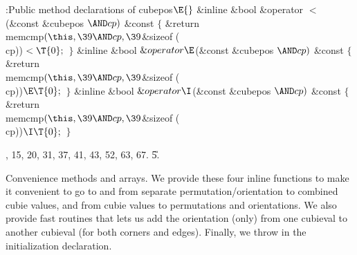 \Y\B\4:Public method declarations of cubepos\X${}\E{}$\6
\&{inline} \&{bool} \&{operator} $<$ (\&{const} \&{cubepos} ${}{\AND}\\{cp})$ %
\&{const} \6
${}\{{}$\1\6
\&{return} \\{memcmp}${}(\this,\39{\AND}\\{cp},\39{}$\&{sizeof} (\\{cp}))${}<%
\T{0};{}$\6
\4${}\}{}$\2\7
\&{inline} \&{bool} ${}\&{operator}{\E}{}$(\&{const} \&{cubepos} ${}{\AND}%
\\{cp}){}$ \&{const}\1\1\2\2\6
${}\{{}$\1\6
\&{return} \\{memcmp}${}(\this,\39{\AND}\\{cp},\39{}$\&{sizeof} (\\{cp}))${}\E%
\T{0};{}$\6
\4${}\}{}$\2\7
\&{inline} \&{bool} ${}\&{operator}{\I}{}$(\&{const} \&{cubepos} ${}{\AND}%
\\{cp}){}$ \&{const}\1\1\2\2\6
${}\{{}$\1\6
\&{return} \\{memcmp}${}(\this,\39{\AND}\\{cp},\39{}$\&{sizeof} (\\{cp}))${}\I%
\T{0};{}$\6
\4${}\}{}$\2\par
{}, 15, 20, 31, 37, 41, 43, 52, 63, 67.
\U5.\fi

Convenience methods and arrays.
We provide these four inline functions to make it convenient to go to
and from separate permutation/orientation to combined cubie values,
and from cubie values to permutations and orientations.  We also provide
fast routines that lets us add the orientation (only) from one
cubieval to another cubieval (for both corners and edges).
Finally, we throw in the initialization declaration.

